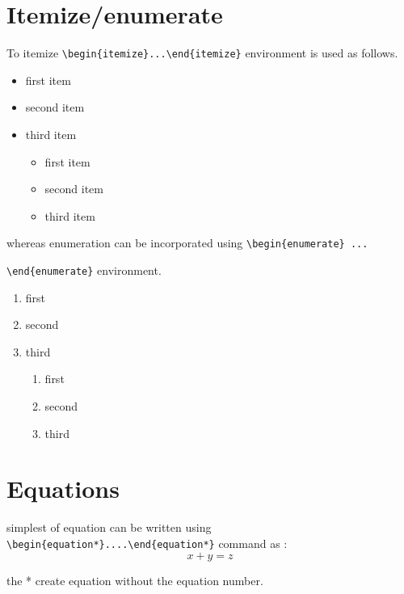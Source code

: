 \section{Itemize/enumerate}
To itemize \verb|\begin{itemize}...\end{itemize}| environment is used as follows.
\begin{itemize}
    \item first item
    \item second item
    \item third item
    \begin{itemize}
        \item first item
        \item second item
        \item third item
     \end{itemize}
\end{itemize}

%
whereas enumeration can be incorporated using \verb|\begin{enumerate} ...|

\verb|\end{enumerate}| environment.
\begin{enumerate}
    \item first 
    \item second
    \item third
    \begin{enumerate}
        \item first 
        \item second
        \item third
    \end{enumerate}
\end{enumerate}
%
%
\section{Equations}
simplest of equation can be written using \verb|\begin{equation*}....\end{equation*}| command
as :
 \begin{equation*}\label{}
	   x+y=z
\end{equation*}

the * create equation without the equation number.

